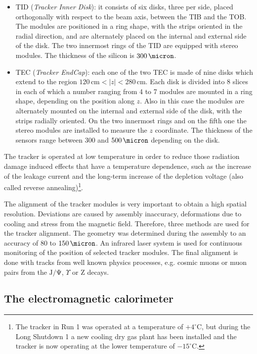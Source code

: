 \begin{itemize}
\item TID (\emph{Tracker Inner Disk}): it consists of six disks, three per side, placed orthogonally with respect to the beam axis, between the TIB and the TOB. The modules are positioned in a ring shape, with the strips oriented in the radial direction, and are alternately placed on the internal and external side of the disk. The two innermost rings of the TID are equipped with stereo modules. The thickness of the silicon is $300\,\micron$.
\item TEC (\emph{Tracker EndCap}): each one of the two TEC is made of nine disks which extend to the region $120\,\mathrm{cm} < |z| < 280\,\mathrm{cm}$. Each disk is divided into 8 slices in each of which a number ranging from 4 to 7 modules are mounted in a ring shape, depending on the position along $z$. Also in this case the modules are alternately mounted on the internal and external side of the disk, with the strips radially oriented. On the two innermost rings and on the fifth one the stereo modules are installed to measure the $z$ coordinate. The thickness of the sensors range between 300 and $500\,\micron$ depending on the disk.
\end{itemize}
The tracker is operated at low temperature in order to reduce those radiation damage induced effects that have a temperature dependence, such as the increase of the leakage current and the long-term increase of the depletion voltage (also called reverse annealing)\footnote{The tracker in Run 1 was operated at a temperature of $+4^{\circ}$C, but during the Long Shutdown 1 a new cooling dry gas plant has been installed and the tracker is now operating at the lower temperature of $-15^{\circ}$C.}.

The alignment of the tracker modules is very important to obtain a high spatial resolution. Deviations are caused by assembly inaccuracy, deformations due to cooling and stress from the magnetic field. Therefore, three methods are used for the tracker alignment.
The geometry was determined during the assembly to an accuracy of 80 to $150\,\micron$. An infrared laser system is used for continuous monitoring of the position of selected tracker modules. The final alignment is done with tracks from well known physics processes, e.g. cosmic muons or muon pairs from the $\mathrm{J/\Psi}$, $\Upsilon$ or Z decays.

\subsection{The electromagnetic calorimeter}

